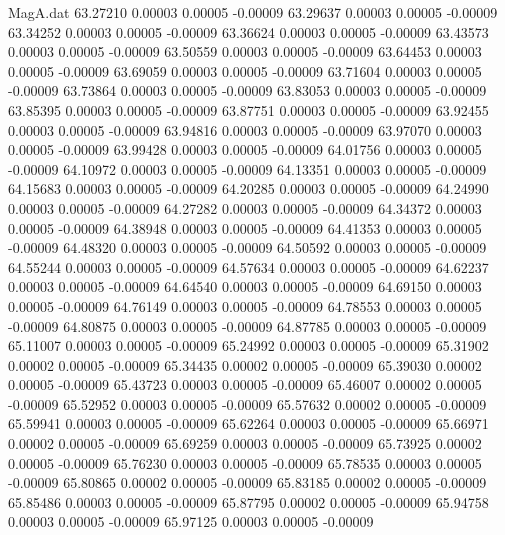 \begin{filecontents}{MagA.dat}
  63.27210    0.00003    0.00005   -0.00009
  63.29637    0.00003    0.00005   -0.00009
  63.34252    0.00003    0.00005   -0.00009
  63.36624    0.00003    0.00005   -0.00009
  63.43573    0.00003    0.00005   -0.00009
  63.50559    0.00003    0.00005   -0.00009
  63.64453    0.00003    0.00005   -0.00009
  63.69059    0.00003    0.00005   -0.00009
  63.71604    0.00003    0.00005   -0.00009
  63.73864    0.00003    0.00005   -0.00009
  63.83053    0.00003    0.00005   -0.00009
  63.85395    0.00003    0.00005   -0.00009
  63.87751    0.00003    0.00005   -0.00009
  63.92455    0.00003    0.00005   -0.00009
  63.94816    0.00003    0.00005   -0.00009
  63.97070    0.00003    0.00005   -0.00009
  63.99428    0.00003    0.00005   -0.00009
  64.01756    0.00003    0.00005   -0.00009
  64.10972    0.00003    0.00005   -0.00009
  64.13351    0.00003    0.00005   -0.00009
  64.15683    0.00003    0.00005   -0.00009
  64.20285    0.00003    0.00005   -0.00009
  64.24990    0.00003    0.00005   -0.00009
  64.27282    0.00003    0.00005   -0.00009
  64.34372    0.00003    0.00005   -0.00009
  64.38948    0.00003    0.00005   -0.00009
  64.41353    0.00003    0.00005   -0.00009
  64.48320    0.00003    0.00005   -0.00009
  64.50592    0.00003    0.00005   -0.00009
  64.55244    0.00003    0.00005   -0.00009
  64.57634    0.00003    0.00005   -0.00009
  64.62237    0.00003    0.00005   -0.00009
  64.64540    0.00003    0.00005   -0.00009
  64.69150    0.00003    0.00005   -0.00009
  64.76149    0.00003    0.00005   -0.00009
  64.78553    0.00003    0.00005   -0.00009
  64.80875    0.00003    0.00005   -0.00009
  64.87785    0.00003    0.00005   -0.00009
  65.11007    0.00003    0.00005   -0.00009
  65.24992    0.00003    0.00005   -0.00009
  65.31902    0.00002    0.00005   -0.00009
  65.34435    0.00002    0.00005   -0.00009
  65.39030    0.00002    0.00005   -0.00009
  65.43723    0.00003    0.00005   -0.00009
  65.46007    0.00002    0.00005   -0.00009
  65.52952    0.00003    0.00005   -0.00009
  65.57632    0.00002    0.00005   -0.00009
  65.59941    0.00003    0.00005   -0.00009
  65.62264    0.00003    0.00005   -0.00009
  65.66971    0.00002    0.00005   -0.00009
  65.69259    0.00003    0.00005   -0.00009
  65.73925    0.00002    0.00005   -0.00009
  65.76230    0.00003    0.00005   -0.00009
  65.78535    0.00003    0.00005   -0.00009
  65.80865    0.00002    0.00005   -0.00009
  65.83185    0.00002    0.00005   -0.00009
  65.85486    0.00003    0.00005   -0.00009
  65.87795    0.00002    0.00005   -0.00009
  65.94758    0.00003    0.00005   -0.00009
  65.97125    0.00003    0.00005   -0.00009

\end{filecontents}
